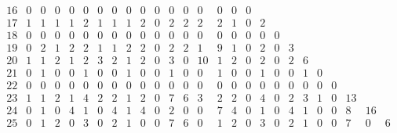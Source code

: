 \begin{landscape}
\[\begin{array}{c|ccccccccccccccccccccccccc}
16&  0&  0&  0&  0&  0&  0&  0&  0&  0&  0&  0&  0&  0&  0&  0&  0&   &   &   &   &   &   &   &   &   \\
17&  1&  1&  1&  1&  2&  1&  1&  1&  2&  0&  2&  2&  2&  2&  1&  0&  2&   &   &   &   &   &   &   &   \\
18&  0&  0&  0&  0&  0&  0&  0&  0&  0&  0&  0&  0&  0&  0&  0&  0&  0&  0&   &   &   &   &   &   &   \\
19&  0&  2&  1&  2&  2&  1&  1&  2&  2&  0&  2&  2&  1&  9&  1&  0&  2&  0&  3&   &   &   &   &   &   \\
20&  1&  1&  2&  1&  2&  3&  2&  1&  2&  0&  3&  0& 10&  1&  2&  0&  2&  0&  2&  6&   &   &   &   &   \\
21&  0&  1&  0&  0&  1&  0&  0&  1&  0&  0&  1&  0&  0&  1&  0&  0&  1&  0&  0&  1&  0&   &   &   &   \\
22&  0&  0&  0&  0&  0&  0&  0&  0&  0&  0&  0&  0&  0&  0&  0&  0&  0&  0&  0&  0&  0&  0&   &   &   \\
23&  1&  1&  2&  1&  4&  2&  2&  1&  2&  0&  7&  6&  3&  2&  2&  0&  4&  0&  2&  3&  1&  0& 13&   &   \\
24&  0&  1&  0&  4&  1&  0&  4&  1&  4&  0&  2&  0&  0&  7&  4&  0&  1&  0&  4&  1&  0&  0&  8& 16&   \\
25&  0&  1&  2&  0&  3&  0&  2&  1&  0&  0&  7&  6&  0&  1&  2&  0&  3&  0&  2&  1&  0&  0&  7&  0&  6\\
\end{array}
\]


\end{landscape}

